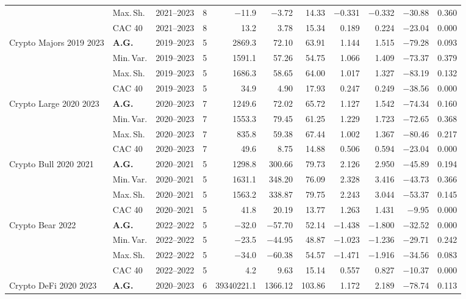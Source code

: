 \begin{longtable}{p{2.6cm} l c c r r r r r r r}
 & Max.\,Sh. & 2021--2023 & 8 & $-$11.9 & $-$3.72 & 14.33 & $-$0.331 & $-$0.332 & $-$30.88 & 0.360 \\
 & CAC 40 & 2021--2023 & 8 & 13.2 & 3.78 & 15.34 & 0.189 & 0.224 & $-$23.04 & 0.000 \\
\midrule
Crypto Majors 2019 2023 & \textbf{A.G.} & 2019--2023 & 5 & 2869.3 & 72.10 & 63.91 & 1.144 & 1.515 & $-$79.28 & 0.093 \\
 & Min.\,Var. & 2019--2023 & 5 & 1591.1 & 57.26 & 54.75 & 1.066 & 1.409 & $-$73.37 & 0.379 \\
 & Max.\,Sh. & 2019--2023 & 5 & 1686.3 & 58.65 & 64.00 & 1.017 & 1.327 & $-$83.19 & 0.132 \\
 & CAC 40 & 2019--2023 & 5 & 34.9 & 4.90 & 17.93 & 0.247 & 0.249 & $-$38.56 & 0.000 \\
\midrule
Crypto Large 2020 2023 & \textbf{A.G.} & 2020--2023 & 7 & 1249.6 & 72.02 & 65.72 & 1.127 & 1.542 & $-$74.34 & 0.160 \\
 & Min.\,Var. & 2020--2023 & 7 & 1553.3 & 79.45 & 61.25 & 1.229 & 1.723 & $-$72.65 & 0.368 \\
 & Max.\,Sh. & 2020--2023 & 7 & 835.8 & 59.38 & 67.44 & 1.002 & 1.367 & $-$80.46 & 0.217 \\
 & CAC 40 & 2020--2023 & 7 & 49.6 & 8.75 & 14.88 & 0.506 & 0.594 & $-$23.04 & 0.000 \\
\midrule
Crypto Bull 2020 2021 & \textbf{A.G.} & 2020--2021 & 5 & 1298.8 & 300.66 & 79.73 & 2.126 & 2.950 & $-$45.89 & 0.194 \\
 & Min.\,Var. & 2020--2021 & 5 & 1631.1 & 348.20 & 76.09 & 2.328 & 3.416 & $-$43.73 & 0.366 \\
 & Max.\,Sh. & 2020--2021 & 5 & 1563.2 & 338.87 & 79.75 & 2.243 & 3.044 & $-$53.37 & 0.145 \\
 & CAC 40 & 2020--2021 & 5 & 41.8 & 20.19 & 13.77 & 1.263 & 1.431 & $-$9.95 & 0.000 \\
\midrule
Crypto Bear 2022 & \textbf{A.G.} & 2022--2022 & 5 & $-$32.0 & $-$57.70 & 52.14 & $-$1.438 & $-$1.800 & $-$32.52 & 0.000 \\
 & Min.\,Var. & 2022--2022 & 5 & $-$23.5 & $-$44.95 & 48.87 & $-$1.023 & $-$1.236 & $-$29.71 & 0.242 \\
 & Max.\,Sh. & 2022--2022 & 5 & $-$34.0 & $-$60.38 & 54.57 & $-$1.471 & $-$1.916 & $-$34.56 & 0.083 \\
 & CAC 40 & 2022--2022 & 5 & 4.2 & 9.63 & 15.14 & 0.557 & 0.827 & $-$10.37 & 0.000 \\
\midrule
Crypto DeFi 2020 2023 & \textbf{A.G.} & 2020--2023 & 6 & 39340221.1 & 1366.12 & 103.86 & 1.172 & 2.189 & $-$78.74 & 0.113 \\

\end{longtable}
